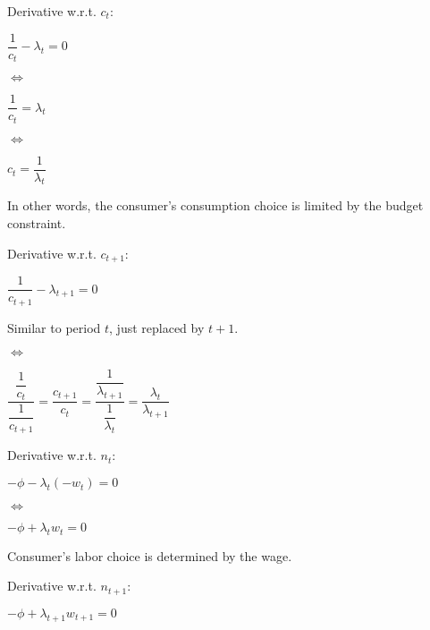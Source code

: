 \documentclass{article}
\begin{document}

Derivative w.r.t. $c_{t}$:

$\dfrac{1}{c_{t}}-\lambda_{t}=0$

$\iff$

$\dfrac{1}{c_{t}}=\lambda_{t}$

$\iff$

$c_{t}=\dfrac{1}{\lambda_{t}}$

In other words, the consumer's consumption choice is limited by the budget constraint.

Derivative w.r.t. $c_{t+1}$:

$\dfrac{1}{c_{t+1}}-\lambda_{t+1}=0$

Similar to period $t$, just replaced by $t+1$.

$\iff$

$\dfrac{\dfrac{1}{c_{t}}}{\dfrac{1}{c_{t+1}}}=\dfrac{c_{t+1}}{c_{t}}=\dfrac{\dfrac{1}{\lambda_{t+1}}}{\dfrac{1}{\lambda_{t}}}=\dfrac{\lambda_{t}}{\lambda_{t+1}}$

Derivative w.r.t. $n_{t}$:

$-\phi-\lambda_{t}\left(-w_{t}\right)=0$

$\iff$

$-\phi+\lambda_{t}w_{t}=0$

Consumer's labor choice is determined by the wage.

Derivative w.r.t. $n_{t+1}$:

$-\phi+\lambda_{t+1}w_{t+1}=0$
\end{document}
